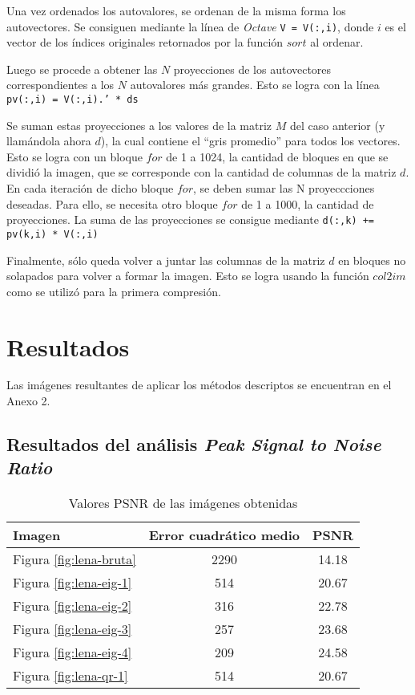 \documentclass[twocolumn,a4paper,10pt]{article}
\begin{document}
Una vez ordenados los autovalores, se ordenan de la misma forma los autovectores. Se consiguen mediante la línea de \textit{Octave} \texttt{V = V(:,i)}, 
donde $i$ es el vector de los índices originales retornados por la función $sort$ al ordenar.

Luego se procede a obtener las $N$ proyecciones de los autovectores correspondientes a los $N$ autovalores más grandes. Esto se logra con la línea 
\texttt{pv(:,i) = V(:,i).' * ds}

Se suman estas proyecciones a los valores de la matriz $M$ del caso anterior (y llam\'andola ahora $d$), la cual contiene el ``gris promedio'' para todos 
los vectores. Esto se logra con un bloque $for$ de 1 a 1024, la cantidad de bloques en que se dividió la imagen, que se corresponde con la cantidad de 
columnas de la matriz $d$. En cada iteración de dicho bloque $for$, se deben sumar las N proyeccciones deseadas. Para ello, se necesita otro bloque $for$
 de 1 a 1000, la cantidad de proyecciones. La suma de las proyecciones se consigue mediante \texttt{d(:,k)\: += pv(k,i) * V(:,i)}

Finalmente, s\'olo queda volver a juntar las columnas de la matriz $d$ en bloques no solapados para volver a formar la imagen. Esto se logra usando 
la funci\'on $col2im$ como se utilizó para la primera compresi\'on.  

\section{Resultados}
\label{sec:resultados}

Las imágenes resultantes de aplicar los métodos descriptos se encuentran en el Anexo 2.

\subsection{Resultados del análisis \textit{Peak Signal to Noise Ratio}}

\begin{table}[H]
    \center
    \begin{tabular}{l|c|c}
        Imagen & Error cuadr\'atico medio & PSNR \\
        \hline

        Figura \ref{fig:lena-bruta} & 2290 & 14.18 \\
        Figura \ref{fig:lena-eig-1} & 514  & 20.67 \\
        Figura \ref{fig:lena-eig-2} & 316  & 22.78 \\
        Figura \ref{fig:lena-eig-3} & 257  & 23.68 \\
        Figura \ref{fig:lena-eig-4} & 209  & 24.58 \\
        Figura \ref{fig:lena-qr-1}  & 514  & 20.67 \\

    \end{tabular}
    \caption{Valores PSNR de las imágenes obtenidas}
    \label{tab:psnr}
\end{table}
\end{document}

